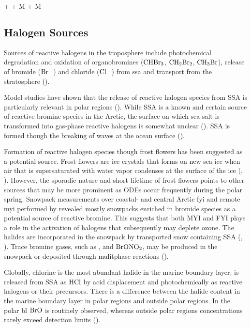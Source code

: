 \begin{reaction}
     +  + M \rightarrow {} + M
    \label{R:clono2}
\end{reaction}

\subsection{Halogen Sources}\label{sec:halogen_sources}

Sources of reactive halogens in the troposphere include photochemical degradation and oxidation of organobromines ($\mathrm{CHBr_3}$, $\mathrm{CH_2Br_2}$, $\mathrm{CH_3Br}$), release of bromide ($\mathrm{Br^-}$) and chloride ($\mathrm{Cl^-}$) from \acrfull{ssa} and transport from the stratosphere (\cite{Schmidt}). 

\medskip

Model studies have shown that the release of reactive halogen species from SSA is particularly relevant in polar regions (\cite{Schmidt}). While SSA is a known and certain source of reactive bromine species in the Arctic, the surface on which sea salt is transformed into gas-phase reactive halogens is somewhat unclear (\cite{Simpson2005}). SSA is formed though the breaking of waves at the ocean surface (\cite{Simpson2015}). 

\medskip

Formation of reactive halogen species though frost flowers has been suggested as a potential source. Frost flowers are ice crystals that forms on new sea ice when air that is supersaturated with water vapor condenses at the surface of the ice (\cite{GRANFORS2013124}, \cite{Kaleschke}). However, the sporadic nature and short lifetime of frost flowers points to other sources that may be more prominent as ODEs occur frequently during the polar spring. Snowpack measurements over coastal- and central Arctic \acrfull{fyi} and remote \acrfull{myi} performed by \cite{Peterson2019} revealed mostly snowpacks enriched in bromide species as a potential source of reactive bromine. This suggests that both MYI and FYI plays a role in the activation of halogens that subsequently may deplete ozone. The halides are incorporated in the snowpack by transported snow containing SSA (\cite{Toyota}, \cite{Peterson2019}). Trace bromine gases, such as ,  and $\mathrm{BrONO_2}$, may be produced in the snowpack or deposited through mulitphase-reactions (\cite{Simpson2005}). 


\medskip


Globally, chlorine is the most abundant halide in the marine boundary layer.  is released from SSA as $\mathrm{HCl}$ by acid displacement and photochemically as reactive halogens or their precursors. There is a difference between the halide content in the marine boundary layer in polar regions and outside polar regions. In the polar \acrshort{bl} $\mathrm{BrO}$ is routinely observed, whereas outside polar regions  concentrations rarely exceed detection limits (\cite{Simpson2015}). 

